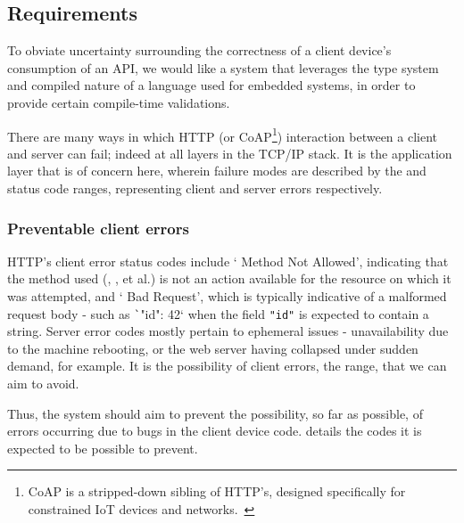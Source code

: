 \subsection{Requirements} \label{intro:req}

To obviate uncertainty surrounding the correctness of a client device's consumption of an API, we would like a system that leverages the type system and compiled nature of a language used for embedded systems, in order to provide certain compile-time validations.

There are many ways in which HTTP (or CoAP\footnote{CoAP is a stripped-down sibling of HTTP's, designed specifically for constrained IoT devices and networks.~\cite{rfc7252}}) interaction between a client and server can fail; indeed at all layers in the TCP/IP stack. It is the application layer that is of concern here, wherein failure modes are described by the  and  status code ranges, representing client and server errors respectively.

\subsubsection{Preventable client errors} \label{intro:req:preventable}
HTTP's client error status codes include ` Method Not Allowed', indicating that the method used (, , et al.) is not an action available for the resource on which it was attempted, and ` Bad Request', which is typically indicative of a malformed request body - such as \texttt`{"id": 42}` when the field \texttt{"id"} is expected to contain a string. Server error codes mostly pertain to ephemeral issues - unavailability due to the machine rebooting, or the web server having collapsed under sudden demand, for example. It is the possibility of client errors, the  range, that we can aim to avoid.

Thus, the system should aim to prevent the possibility, so far as possible, of errors occurring due to bugs in the client device code.  details the codes it is expected to be possible to prevent.

